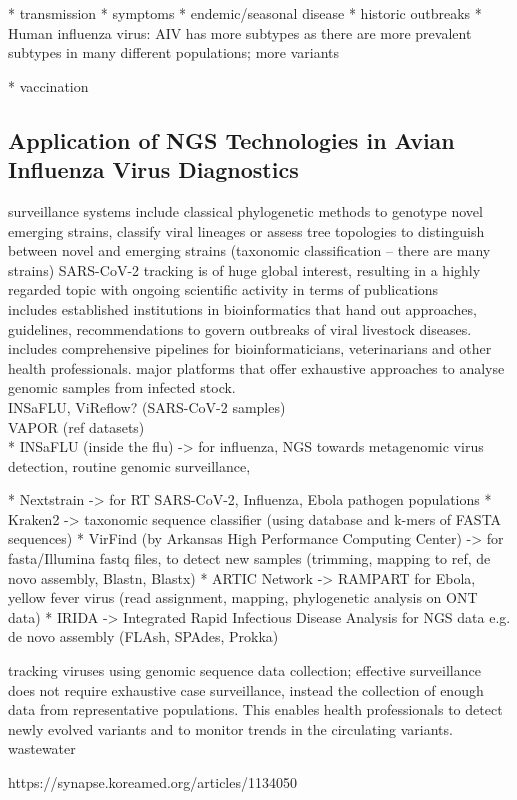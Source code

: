 * transmission
* symptoms
* endemic/seasonal disease
* historic outbreaks
* Human influenza virus:
AIV has more subtypes as there are more prevalent subtypes in many different populations; more variants

* vaccination

\subsection{Application of NGS Technologies in Avian Influenza Virus Diagnostics}
surveillance systems include classical phylogenetic methods to genotype novel emerging strains, classify viral lineages or assess tree topologies to distinguish between novel and emerging strains (taxonomic classification -- there are many strains)
SARS-CoV-2 tracking is of huge global interest, resulting in a highly regarded topic with ongoing scientific activity in terms of publications \\
includes established institutions in bioinformatics that hand out approaches, guidelines, recommendations to govern outbreaks of viral livestock diseases. includes comprehensive pipelines for bioinformaticians, veterinarians and other health professionals.
major platforms that offer exhaustive approaches to analyse genomic samples from infected stock. \\

INSaFLU, ViReflow? (SARS-CoV-2 samples) \\
 VAPOR (ref datasets) \\

* INSaFLU (inside the flu) -> for influenza, NGS towards metagenomic virus detection, routine genomic surveillance, 

* Nextstrain -> for RT SARS-CoV-2, Influenza, Ebola pathogen populations 
* Kraken2 -> taxonomic sequence classifier (using database and k-mers of FASTA sequences)
* VirFind (by Arkansas High Performance Computing Center) -> for fasta/Illumina fastq files, to detect new samples (trimming, mapping to ref, de novo assembly, Blastn, Blastx)
* ARTIC Network -> RAMPART for Ebola, yellow fever virus (read assignment, mapping, phylogenetic analysis on ONT data)
* IRIDA -> Integrated Rapid Infectious Disease Analysis for NGS data e.g. de novo assembly (FLAsh, SPAdes, Prokka)

tracking viruses using genomic sequence data collection; effective surveillance does not require exhaustive case surveillance, instead the collection of enough data from representative populations. This enables health professionals to detect newly evolved variants and to monitor trends in the circulating variants.\\
wastewater

https://synapse.koreamed.org/articles/1134050
